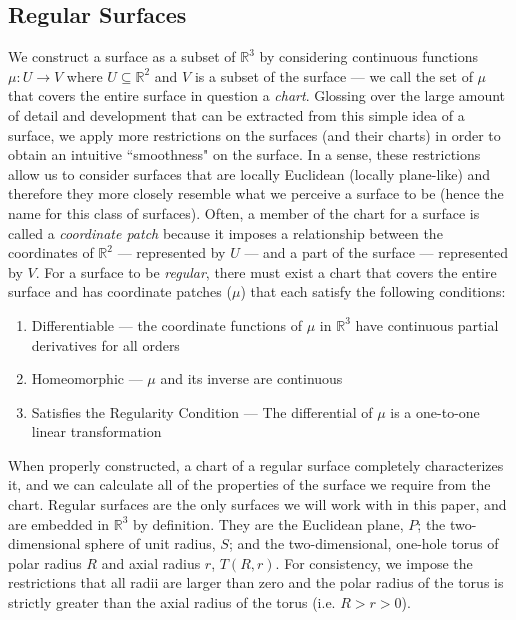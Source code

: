 \documentclass[12pt]{article}
\newcommand{\R}{\mathbb{R}}
\begin{document}
	\subsection{Regular Surfaces}
		We construct a surface as a subset of $\R^3$ by considering continuous functions $\mu:U \to V$ where $U \subseteq \R^2$ and $V$ is a subset of the surface --- we call the set of $\mu$ that covers the entire surface in question a \textit{chart}.
		Glossing over the large amount of detail and development that can be extracted from this simple idea of a surface, we apply more restrictions on the surfaces (and their charts) in order to obtain an intuitive ``smoothness" on the surface.
		In a sense, these restrictions allow us to consider surfaces that are locally Euclidean (locally plane-like) and therefore they more closely resemble what we perceive a surface to be (hence the name for this class of surfaces).
		Often, a member of the chart for a surface is called a \emph{coordinate patch} because it imposes a relationship between the coordinates of $\R^2$ --- represented by $U$ --- and a part of the surface --- represented by $V$.
		For a surface to be \emph{regular}, there must exist a chart that covers the entire surface and has coordinate patches ($\mu$) that each satisfy the following conditions:
		\begin{enumerate}
			\item Differentiable --- the coordinate functions of $\mu$ in $\R^3$ have continuous partial derivatives for all orders
			\item Homeomorphic --- $\mu$ and its inverse are continuous
			\item Satisfies the Regularity Condition --- The differential of $\mu$ is a one-to-one linear transformation
		\end{enumerate}
		When properly constructed, a chart of a regular surface completely characterizes it, and we can calculate all of the properties of the surface we require from the chart.
		Regular surfaces are the only surfaces we will work with in this paper, and are embedded in $\R^3$ by definition.
		They are the Euclidean plane, $P$; the two-dimensional sphere of unit radius, $S$; and the two-dimensional, one-hole torus of polar radius $R$ and axial radius $r$, $T(R,r)$.
		For consistency, we impose the restrictions that all radii are larger than zero and the polar radius of the torus is strictly greater than the axial radius of the torus (i.e. $R > r > 0$).
	
\end{document}

